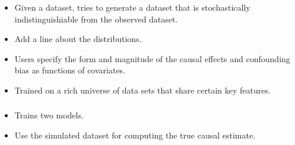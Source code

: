\documentclass{beamer}
\begin{document}
\begin{frame}
	\frametitle{}
	\begin{itemize}
		\item Given a dataset, tries to generate a dataset that is stochastically 
			indistinguishiable from the observed dataset.
		\item Add a line about the distributions.
		\item Users specify the form and magnitude of the causal effects and confounding bias as functions of covariates.
		\item Trained on a rich universe of data sets that share certain key features.
	\end{itemize}
\end{frame}

\begin{frame}
	\frametitle{}
	\begin{itemize}
		\item Trains two models.
		\item Use the simulated dataset for computing the true causal estimate.
	\end{itemize}
\end{frame}
\end{document}
